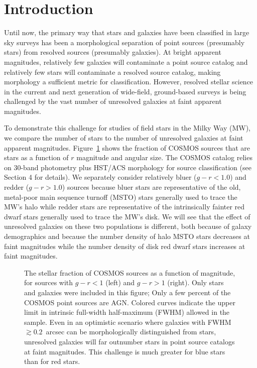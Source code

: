 \documentclass[12pt,preprint]{aastex}
\begin{document}
%
%
\section{Introduction}

Until now, the primary way that stars and galaxies have been
classified in large sky surveys has been a morphological separation
\citep[e.g.,][]{kron80,yee91,vasconcellos11a,henrion11a} of point
sources (presumably stars) from resolved sources (presumably
galaxies).  At bright apparent magnitudes, relatively few galaxies
will contaminate a point source catalog and relatively few stars will
contaminate a resolved source catalog, making morphology a sufficient
metric for classification.  However, resolved stellar science in the
current and next generation of wide-field, ground-based surveys is
being challenged by the vast number of unresolved galaxies at faint
apparent magnitudes.  

To demonstrate this challenge for studies of field stars in the Milky Way (MW),
we compare the number of stars to the number of unresolved galaxies at
faint apparent magnitudes.  Figure~\ref{fig:stellarfraction} shows the
fraction of COSMOS sources that are stars as a function of $r$
magnitude and angular size.  The COSMOS catalog \citep[($l,b$) $\sim$ (237,43)
degrees, ][]{capak07a,scoville07b,ilbert09} relies on 30-band photometry
plus HST/ACS morphology for source classification (see Section 4 for
details).  We separately consider relatively bluer ($g-r < 1.0$) and redder ($g-r
> 1.0$) sources because bluer stars are representative of the old,
metal-poor main sequence turnoff (MSTO) stars generally used to trace
the MW's halo while redder stars are representative of the
intrinsically fainter red dwarf stars generally used to trace the MW's
disk.  We will see that the effect of unresolved galaxies on these two
populations is different, both because of galaxy demographics and
because the number density of halo MSTO stars decreases at faint
magnitudes while the number density of disk red dwarf stars increases at
faint magnitudes.
\begin{figure}
\centering
\caption{The stellar fraction of COSMOS sources as a function of
  magnitude, for sources with $g-r<1$ (left) and $g-r>1$ (right).
  Only stars and galaxies were included in this figure; Only a few
  percent of the COSMOS point sources are AGN.  Colored curves
  indicate the upper limit in intrinsic full-width half-maximum
  (FWHM) allowed in the sample.  Even in an optimistic scenario where
  galaxies with FWHM $\gtrsim 0.2$~arcsec can be morphologically distinguished
  from stars, unresolved galaxies will far outnumber stars in point
  source catalogs at faint magnitudes.  This challenge is much greater
  for blue stars than for red stars.}
\label{fig:stellarfraction}
\end{figure}
 
\end{document}
